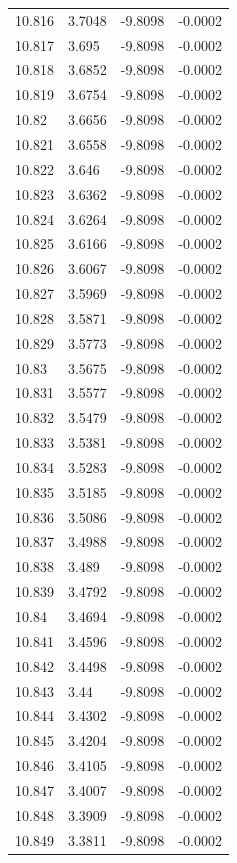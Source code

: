 \begin{tabular}{llll}
10.816 & 3.7048 & -9.8098 & -0.0002 \\
10.817 & 3.695 & -9.8098 & -0.0002 \\
10.818 & 3.6852 & -9.8098 & -0.0002 \\
10.819 & 3.6754 & -9.8098 & -0.0002 \\
10.82 & 3.6656 & -9.8098 & -0.0002 \\
10.821 & 3.6558 & -9.8098 & -0.0002 \\
10.822 & 3.646 & -9.8098 & -0.0002 \\
10.823 & 3.6362 & -9.8098 & -0.0002 \\
10.824 & 3.6264 & -9.8098 & -0.0002 \\
10.825 & 3.6166 & -9.8098 & -0.0002 \\
10.826 & 3.6067 & -9.8098 & -0.0002 \\
10.827 & 3.5969 & -9.8098 & -0.0002 \\
10.828 & 3.5871 & -9.8098 & -0.0002 \\
10.829 & 3.5773 & -9.8098 & -0.0002 \\
10.83 & 3.5675 & -9.8098 & -0.0002 \\
10.831 & 3.5577 & -9.8098 & -0.0002 \\
10.832 & 3.5479 & -9.8098 & -0.0002 \\
10.833 & 3.5381 & -9.8098 & -0.0002 \\
10.834 & 3.5283 & -9.8098 & -0.0002 \\
10.835 & 3.5185 & -9.8098 & -0.0002 \\
10.836 & 3.5086 & -9.8098 & -0.0002 \\
10.837 & 3.4988 & -9.8098 & -0.0002 \\
10.838 & 3.489 & -9.8098 & -0.0002 \\
10.839 & 3.4792 & -9.8098 & -0.0002 \\
10.84 & 3.4694 & -9.8098 & -0.0002 \\
10.841 & 3.4596 & -9.8098 & -0.0002 \\
10.842 & 3.4498 & -9.8098 & -0.0002 \\
10.843 & 3.44 & -9.8098 & -0.0002 \\
10.844 & 3.4302 & -9.8098 & -0.0002 \\
10.845 & 3.4204 & -9.8098 & -0.0002 \\
10.846 & 3.4105 & -9.8098 & -0.0002 \\
10.847 & 3.4007 & -9.8098 & -0.0002 \\
10.848 & 3.3909 & -9.8098 & -0.0002 \\
10.849 & 3.3811 & -9.8098 & -0.0002 \\

\end{tabular}
